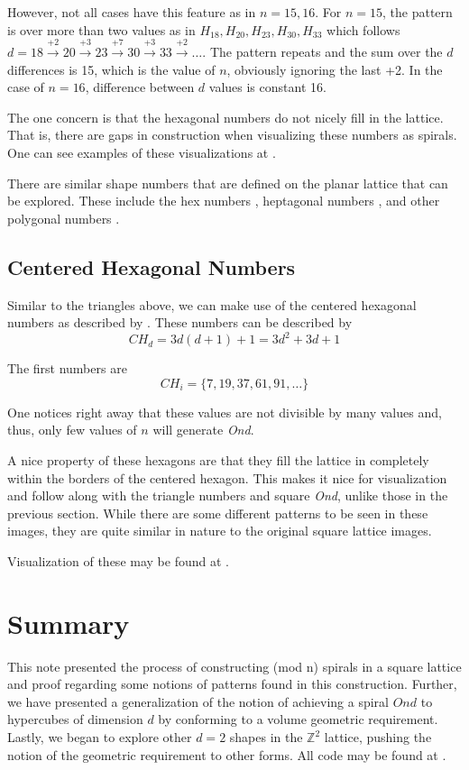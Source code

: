 \documentclass[11pt,reqno]{amsart}
\theoremstyle{mydef}
\begin{document}
However, not all cases have this feature as in $n = 15, 16$. For $n = 15$, the pattern is over more
than two values  as in $H_{18}, H_{20}, H_{23}, H_{30}, H_{33}$ which follows 
$d = 18 \xrightarrow{+2} 20 \xrightarrow{+3} 23 \xrightarrow{+7} 30 \xrightarrow{+3} 33 \xrightarrow{+2} \ldots$. The pattern repeats and the sum
over the $d$ differences is 15, which is the value of $n$, obviously ignoring the last +2. In the case of $n = 16$, difference between $d$ values is constant 16.

The one concern is that the hexagonal numbers do not nicely fill in the lattice. That is, there are gaps in construction when
visualizing these numbers as spirals. One can see examples of these visualizations at \cite{hexvis}.

There are similar shape numbers that are defined on the planar lattice that can be explored. These include the 
hex numbers \cite{HexNum}, heptagonal numbers \cite{Hepta}, and other polygonal numbers \cite{Polyg}.

\subsection{Centered Hexagonal Numbers}

Similar to the triangles above, we can make use of the centered hexagonal numbers as described by
\cite{oeisCHex}.  These numbers can be described by
\[
	CH_d = 3d(d+1)+1 = 3d^2 + 3d + 1
\]

The first numbers are
\[
  	CH_i = \{ 7, 19, 37, 61, 91, \ldots \}
\]

One notices right away that these values are not divisible by many values and, thus, only few values of $n$ will generate
\emph{Ond}.

A nice property of these hexagons are that they fill the lattice in completely within the borders of the centered hexagon.
This makes it nice for visualization and follow along with the triangle numbers and square \emph{Ond}, unlike those in 
the previous section. While there are some different patterns to be seen in these images, they are quite similar in nature
to the original square lattice images.

Visualization of these may be found at \cite{chexvis}.
\section{Summary}
This note presented the process of constructing (mod n) spirals in a square lattice and proof regarding some 
notions of patterns found in this construction. Further, we have presented a generalization of the notion of
achieving a spiral $Ond$ to hypercubes of dimension $d$ by conforming to a volume geometric requirement.
Lastly, we began to explore other $d = 2$ shapes in the $\mathbb{Z}^2$ lattice, pushing the notion of the 
geometric requirement to other forms. All code may be found at \cite{PySquare}.
\end{document}
